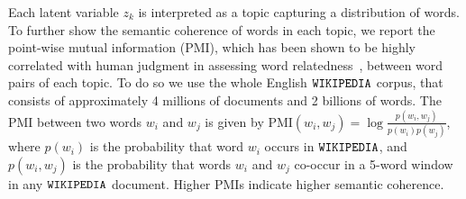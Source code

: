 Each latent variable $z_k$ is interpreted as a topic capturing a distribution of words. To further show the semantic coherence of words in each topic, we report the  point-wise mutual information (PMI), which has been shown to be highly correlated with human judgment in assessing word relatedness~\citep{newman2009external}, between word pairs of each topic. To do so we use the whole English $\tt WIKIPEDIA$ corpus, that consists of approximately 4 millions of documents and 2 billions of words. The PMI between two words $w_i$ and $w_j$ is given by $\text{PMI}(w_i,w_j)=\log \frac{p(w_i,w_j)}{p(w_i) p(w_j)}$,
 where  $p(w_i)$  is the probability that word $w_i$ occurs in  $\tt WIKIPEDIA$, and $p(w_i,w_{j})$ is the probability that words $w_i$ and $w_{j}$ co-occur in a 5-word window in any $\tt WIKIPEDIA$ document. Higher PMIs indicate higher semantic coherence.


